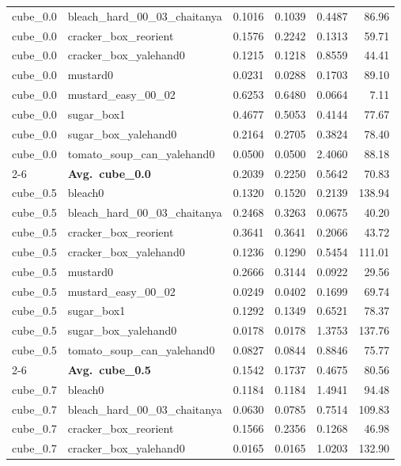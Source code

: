 \begin{longtable}{llrrrr}
  cube_0.0 & bleach\_hard\_00\_03\_chaitanya & 0.1016 & 0.1039 & 0.4487 & 86.96 \\
  cube_0.0 & cracker\_box\_reorient & 0.1576 & 0.2242 & 0.1313 & 59.71 \\
  cube_0.0 & cracker\_box\_yalehand0 & 0.1215 & 0.1218 & 0.8559 & 44.41 \\
  cube_0.0 & mustard0 & 0.0231 & 0.0288 & 0.1703 & 89.10 \\
  cube_0.0 & mustard\_easy\_00\_02 & 0.6253 & 0.6480 & 0.0664 & 7.11 \\
  cube_0.0 & sugar\_box1 & 0.4677 & 0.5053 & 0.4144 & 77.67 \\
  cube_0.0 & sugar\_box\_yalehand0 & 0.2164 & 0.2705 & 0.3824 & 78.40 \\
  cube_0.0 & tomato\_soup\_can\_yalehand0 & 0.0500 & 0.0500 & 2.4060 & 88.18 \\
  \cmidrule{2-6}
  & \textbf{Avg.~cube_0.0} & 0.2039 & 0.2250 & 0.5642 & 70.83 \\
  \midrule
  cube_0.5 & bleach0 & 0.1320 & 0.1520 & 0.2139 & 138.94 \\
  cube_0.5 & bleach\_hard\_00\_03\_chaitanya & 0.2468 & 0.3263 & 0.0675 & 40.20 \\
  cube_0.5 & cracker\_box\_reorient & 0.3641 & 0.3641 & 0.2066 & 43.72 \\
  cube_0.5 & cracker\_box\_yalehand0 & 0.1236 & 0.1290 & 0.5454 & 111.01 \\
  cube_0.5 & mustard0 & 0.2666 & 0.3144 & 0.0922 & 29.56 \\
  cube_0.5 & mustard\_easy\_00\_02 & 0.0249 & 0.0402 & 0.1699 & 69.74 \\
  cube_0.5 & sugar\_box1 & 0.1292 & 0.1349 & 0.6521 & 78.37 \\
  cube_0.5 & sugar\_box\_yalehand0 & 0.0178 & 0.0178 & 1.3753 & 137.76 \\
  cube_0.5 & tomato\_soup\_can\_yalehand0 & 0.0827 & 0.0844 & 0.8846 & 75.77 \\
  \cmidrule{2-6}
  & \textbf{Avg.~cube_0.5} & 0.1542 & 0.1737 & 0.4675 & 80.56 \\
  \midrule
  cube_0.7 & bleach0 & 0.1184 & 0.1184 & 1.4941 & 94.48 \\
  cube_0.7 & bleach\_hard\_00\_03\_chaitanya & 0.0630 & 0.0785 & 0.7514 & 109.83 \\
  cube_0.7 & cracker\_box\_reorient & 0.1566 & 0.2356 & 0.1268 & 46.98 \\
  cube_0.7 & cracker\_box\_yalehand0 & 0.0165 & 0.0165 & 1.0203 & 132.90 \\

\end{longtable}
